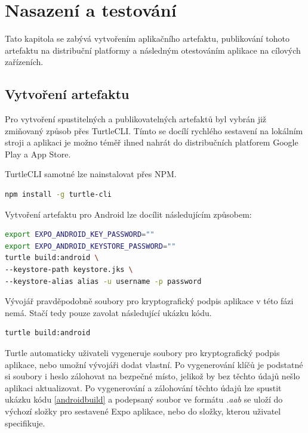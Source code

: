 \chapter{Nasazení a testování}

Tato kapitola se zabývá vytvořením aplikačního artefaktu, publikování tohoto artefaktu na distribuční platformy a následným otestováním aplikace na cílových zařízeních.

\section{Vytvoření artefaktu}

Pro vytvoření spustitelných a publikovatelných artefaktů byl vybrán již zmiňovaný způsob přes TurtleCLI. Tímto se docílí rychlého sestavení na lokálním stroji a aplikaci je možno téměř ihned nahrát do distribučních platforem Google Play a App Store.

TurtleCLI samotné lze nainstalovat přes NPM.

\begin{lstlisting}[language=Bash, caption=Instalace TurtleCLI]
npm install -g turtle-cli
\end{lstlisting}

Vytvoření artefaktu pro Android lze docílit následujícím způsobem:

\begin{lstlisting}[language=Bash, caption=Sestavení na Android,label={androidbuild}]
export EXPO_ANDROID_KEY_PASSWORD=""
export EXPO_ANDROID_KEYSTORE_PASSWORD=""
turtle build:android \
--keystore-path keystore.jks \
--keystore-alias alias -u username -p password
\end{lstlisting}

Vývojář pravděpodobně soubory pro kryptografický podpis aplikace v této fázi nemá. Stačí tedy pouze zavolat následující ukázku kódu.

\begin{lstlisting}[language=Bash, caption=Sestavení na Android]
turtle build:android
\end{lstlisting}

Turtle automaticky uživateli vygeneruje soubory pro kryptografický podpis aplikace, nebo umožní vývojáři dodat vlastní. Po vygenerování klíčů je podstatné si soubory i heslo zálohovat na bezpečné místo, jelikož by bez těchto údajů nešlo aplikaci aktualizovat. Po vygenerování a zálohování těchto údajů lze spustit ukázku kódu \ref{androidbuild} a podepsaný soubor ve formátu \emph{.aab} se uloží do výchozí složky pro sestavené Expo aplikace, nebo do složky, kterou uživatel specifikuje.

